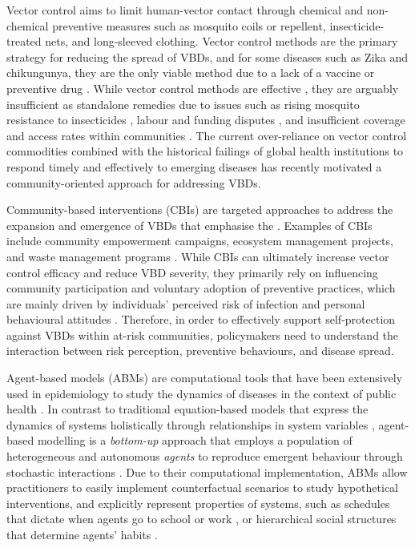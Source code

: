 Vector control aims to limit human-vector contact through chemical and non-chemical preventive measures such as mosquito coils or repellent, insecticide-treated nets, and long-sleeved clothing. Vector control methods are the primary strategy for reducing the spread of VBDs, and for some diseases such as Zika and chikungunya, they are the only viable method due to a lack of a vaccine or preventive drug \cite{wilson_importance_2020}. While vector control methods are effective \cite{wilson_importance_2020, chala_emerging_2021}, they are arguably insufficient as standalone remedies due to issues such as rising mosquito resistance to insecticides \cite{hemingway_averting_2016}, labour and funding disputes \cite{winch_effectiveness_1992}, and insufficient coverage and access rates within communities \cite{okumu_what_2022}. The current over-reliance on vector control commodities combined with the historical failings of global health institutions to respond timely and effectively to emerging diseases \cite{bardosh_addressing_2017} has recently motivated a community-oriented approach for addressing VBDs.

Community-based interventions (CBIs) are targeted approaches to address the expansion and emergence of VBDs that emphasise the  \cite{bardosh_addressing_2017}. Examples of CBIs include community empowerment campaigns, ecosystem management projects, and waste management programs \cite{perez_realist_2021}. While CBIs can ultimately increase vector control efficacy and reduce VBD severity, they primarily rely on influencing community participation and voluntary adoption of preventive practices, which are mainly driven by individuals' perceived risk of infection and personal behavioural attitudes \cite{brewer_risk_2004, raude_public_2012, lopes-rafegas_contribution_2023}. Therefore, in order to effectively support self-protection against VBDs within at-risk communities, policymakers need to understand the interaction between risk perception, preventive behaviours, and disease spread.

Agent-based models (ABMs) are computational tools that have been extensively used in epidemiology to study the dynamics of diseases in the context of public health \cite{tracy_agent-based_2018, speybroeck_simulation_2013}. In contrast to traditional equation-based models that express the dynamics of systems holistically through relationships in system variables \cite{van_dyke_parunak_agent-based_1998}, agent-based modelling is a \textit{bottom-up} approach that employs a population of heterogeneous and autonomous \textit{agents} to reproduce emergent behaviour through stochastic interactions \cite{epstein_growing_1996}. Due to their computational implementation, ABMs allow practitioners to easily implement counterfactual scenarios to study hypothetical interventions, and explicitly represent properties of systems, such as schedules that dictate when agents go to school or work \cite{pangallo_unequal_2023}, or hierarchical social structures that determine agents' habits \cite{xu_synthetic_2017}.

